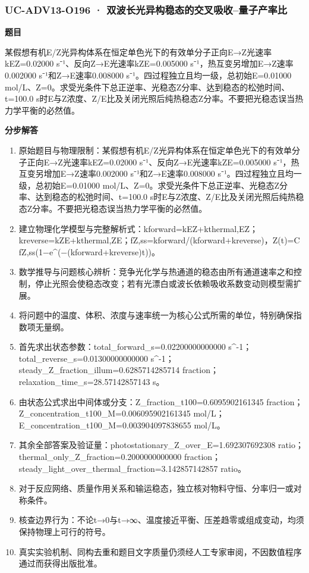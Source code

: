 \documentclass[UTF8,11pt,a4paper]{ctexart}
\begin{document}
\subsubsection*{UC-ADV13-O196 · 双波长光异构稳态的交叉吸收–量子产率比}
\noindent\textbf{题目}\par
某假想有机E/Z光异构体系在恒定单色光下的有效单分子正向E→Z光速率kEZ=0.02000 s⁻¹、反向Z→E光速率kZE=0.005000 s⁻¹，热互变另增加E→Z速率0.002000 s⁻¹和Z→E速率0.008000 s⁻¹。四过程独立且均一级，总初始E=0.01000 mol/L、Z=0。求受光条件下总正逆率、光稳态Z分率、达到稳态的松弛时间、t=100.0 s时E与Z浓度、Z/E比及关闭光照后纯热稳态Z分率。不要把光稳态误当热力学平衡的必然值。\par
\medskip\noindent\textbf{分步解答}
\begin{enumerate}
\item 原始题目与物理限制：某假想有机E/Z光异构体系在恒定单色光下的有效单分子正向E→Z光速率kEZ=0.02000 s⁻¹、反向Z→E光速率kZE=0.005000 s⁻¹，热互变另增加E→Z速率0.002000 s⁻¹和Z→E速率0.008000 s⁻¹。四过程独立且均一级，总初始E=0.01000 mol/L、Z=0。求受光条件下总正逆率、光稳态Z分率、达到稳态的松弛时间、t=100.0 s时E与Z浓度、Z/E比及关闭光照后纯热稳态Z分率。不要把光稳态误当热力学平衡的必然值。
\item 建立物理化学模型与完整解析式：kforward=kEZ+kthermal,EZ；kreverse=kZE+kthermal,ZE；fZ,ss=kforward/(kforward+kreverse)，Z(t)=C fZ,ss(1−e\textasciicircum{}(−(kforward+kreverse)t))。
\item 数学推导与问题核心辨析：竞争光化学与热通道的稳态由所有通道速率之和控制，停止光照会使稳态改变；若有光漂白或波长依赖吸收系数变动则模型需扩展。
\item 将问题中的温度、体积、浓度与速率统一为核心公式所需的单位，特别确保指数项无量纲。
\item 首先求出状态参数：total\_forward\_s=0.02200000000000 s\textasciicircum{}-1；total\_reverse\_s=0.01300000000000 s\textasciicircum{}-1；steady\_Z\_fraction\_illum=0.6285714285714 fraction；relaxation\_time\_s=28.57142857143 s。
\item 由状态公式求出中间体或分支：Z\_fraction\_t100=0.6095902161345 fraction；Z\_concentration\_t100\_M=0.006095902161345 mol/L；E\_concentration\_t100\_M=0.003904097838655 mol/L。
\item 其余全部答案及验证量：photostationary\_Z\_over\_E=1.692307692308 ratio；thermal\_only\_Z\_fraction=0.2000000000000 fraction；steady\_light\_over\_thermal\_fraction=3.142857142857 ratio。
\item 对于反应网络、质量作用关系和输运稳态，独立核对物料守恒、分率归一或对称条件。
\item 核查边界行为：不论t→0与t→∞、温度接近平衡、压差趋零或组成变动，均须保持物理上可行的符号。
\item 真实实验机制、同构去重和题目文字质量仍须经人工专家审阅，不因数值程序通过而获得出版批准。
\end{enumerate}
\end{document}
